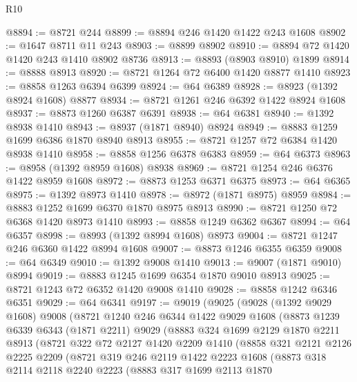 \begin{lexlean}{R10}
\begin{coremodule}
@8894 := @8721 @244
@8899 := @8894 @246 @1420 @1422 @243 @1608
@8902 := @1647 @8711 @11 @243
@8903 := @8899 @8902
@8910 := @8894 @72 @1420 @1420 @243 @1410 @8902 @8736
@8913 := @8893 (@8903 @8910) @1899
@8914 := @8888 @8913
@8920 := @8721 @1264 @72 @6400 @1420 @8877 @1410
@8923 := @8858 @1263 @6394 @6399
@8924 := @64 @6389
@8928 := @8923 (@1392 @8924 @1608) @8877
@8934 := @8721 @1261 @246 @6392 @1422 @8924 @1608
@8937 := @8873 @1260 @6387 @6391
@8938 := @64 @6381
@8940 := @1392 @8938 @1410
@8943 := @8937 (@1871 @8940) @8924
@8949 := @8883 @1259 @1699 @6386 @1870 @8940 @8913
@8955 := @8721 @1257 @72 @6384 @1420 @8938 @1410
@8958 := @8858 @1256 @6378 @6383
@8959 := @64 @6373
@8963 := @8958 (@1392 @8959 @1608) @8938
@8969 := @8721 @1254 @246 @6376 @1422 @8959 @1608
@8972 := @8873 @1253 @6371 @6375
@8973 := @64 @6365
@8975 := @1392 @8973 @1410
@8978 := @8972 (@1871 @8975) @8959
@8984 := @8883 @1252 @1699 @6370 @1870 @8975 @8913
@8990 := @8721 @1250 @72 @6368 @1420 @8973 @1410
@8993 := @8858 @1249 @6362 @6367
@8994 := @64 @6357
@8998 := @8993 (@1392 @8994 @1608) @8973
@9004 := @8721 @1247 @246 @6360 @1422 @8994 @1608
@9007 := @8873 @1246 @6355 @6359
@9008 := @64 @6349
@9010 := @1392 @9008 @1410
@9013 := @9007 (@1871 @9010) @8994
@9019 := @8883 @1245 @1699 @6354 @1870 @9010 @8913
@9025 := @8721 @1243 @72 @6352 @1420 @9008 @1410
@9028 := @8858 @1242 @6346 @6351
@9029 := @64 @6341
@9197 := @9019
    (@9025
      (@9028
        (@1392 @9029 @1608)
        @9008
        (@8721
          @1240
          @246
          @6344
          @1422
          @9029
          @1608
          (@8873
            @1239
            @6339
            @6343
            (@1871 @2211)
            @9029
            (@8883
              @324
              @1699
              @2129
              @1870
              @2211
              @8913
              (@8721
                @322
                @72
                @2127
                @1420
                @2209
                @1410
                (@8858
                  @321
                  @2121
                  @2126
                  @2225
                  @2209
                  (@8721
                    @319
                    @246
                    @2119
                    @1422
                    @2223
                    @1608
                    (@8873
                      @318
                      @2114
                      @2118
                      @2240
                      @2223
                      (@8883
                        @317
                        @1699
                        @2113
                        @1870

\end{coremodule}
\end{lexlean}
